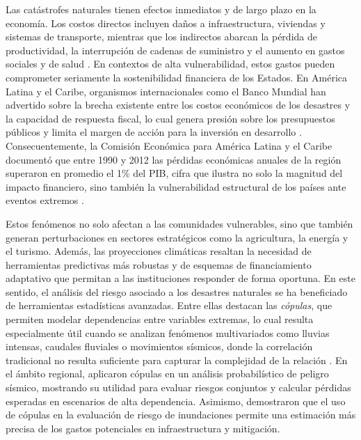\documentclass[12pt, a4paper]{article}
\begin{document}
Las catástrofes naturales tienen efectos inmediatos y de largo plazo en la economía. Los costos directos incluyen daños a infraestructura, viviendas y sistemas de transporte, mientras que los indirectos abarcan la pérdida de productividad, la interrupción de cadenas de suministro y el aumento en gastos sociales y de salud \cite{Paniagua1995}. En contextos de alta vulnerabilidad, estos gastos pueden comprometer seriamente la sostenibilidad financiera de los Estados. En América Latina y el Caribe, organismos internacionales como el Banco Mundial han advertido sobre la brecha existente entre los costos económicos de los desastres y la capacidad de respuesta fiscal, lo cual genera presión sobre los presupuestos públicos y limita el margen de acción para la inversión en desarrollo \cite[p. 23]{bancamundial2021}. Consecuentemente, la Comisión Económica para América Latina y el Caribe documentó que entre 1990 y 2012 las pérdidas económicas anuales de la región superaron en promedio el 1\% del PIB, cifra que ilustra no solo la magnitud del impacto financiero, sino también la vulnerabilidad estructural de los países ante eventos extremos \cite[p. 45]{cepal2014}.

Estos fenómenos no solo afectan a las comunidades vulnerables, sino que también generan perturbaciones en sectores estratégicos como la agricultura, la energía y el turismo. Además, las proyecciones climáticas resaltan la necesidad de herramientas predictivas más robustas y de esquemas de financiamiento adaptativo que permitan a las instituciones responder de forma oportuna. En este sentido, el análisis del riesgo asociado a los desastres naturales se ha beneficiado de herramientas estadísticas avanzadas. Entre ellas destacan las \textit{cópulas}, que permiten modelar dependencias entre variables extremas, lo cual resulta especialmente útil cuando se analizan fenómenos multivariados como lluvias intensas, caudales fluviales o movimientos sísmicos, donde la correlación tradicional no resulta suficiente para capturar la complejidad de la relación \cite{patton2012review, krupskii2013factor}. En el ámbito regional,  aplicaron cópulas en un análisis probabilístico de peligro sísmico, mostrando su utilidad para evaluar riesgos conjuntos y calcular pérdidas esperadas en escenarios de alta dependencia. Asimismo,  demostraron que el uso de cópulas en la evaluación de riesgo de inundaciones permite una estimación más precisa de los gastos potenciales en infraestructura y mitigación.
\end{document}
